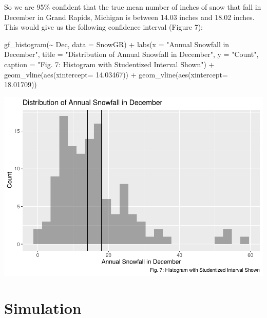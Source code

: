 \documentclass[12pt]{article}
\newenvironment{Shaded}{\begin{snugshade}}{\end{snugshade}}
\newcommand{\AttributeTok}[1]{\textcolor[rgb]{0.77,0.63,0.00}{#1}}
\newcommand{\FloatTok}[1]{\textcolor[rgb]{0.00,0.00,0.81}{#1}}
\newcommand{\FunctionTok}[1]{\textcolor[rgb]{0.00,0.00,0.00}{#1}}
\newcommand{\NormalTok}[1]{#1}
\newcommand{\SpecialCharTok}[1]{\textcolor[rgb]{0.00,0.00,0.00}{#1}}
\newcommand{\StringTok}[1]{\textcolor[rgb]{0.31,0.60,0.02}{#1}}
\begin{document}
So we are 95\% confident that the true mean number of inches of snow
that fall in December in Grand Rapids, Michigan is between 14.03 inches
and 18.02 inches. This would give us the following confidence interval
(Figure 7):

\begin{Shaded}
\begin{Highlighting}[]
\FunctionTok{gf\_histogram}\NormalTok{(}\SpecialCharTok{\textasciitilde{}}\NormalTok{ Dec, }\AttributeTok{data =}\NormalTok{ SnowGR) }\SpecialCharTok{+}
  \FunctionTok{labs}\NormalTok{(}\AttributeTok{x =} \StringTok{"Annual Snowfall in December"}\NormalTok{, }
       \AttributeTok{title =} \StringTok{"Distribution of Annual Snowfall in December"}\NormalTok{, }\AttributeTok{y =} \StringTok{"Count"}\NormalTok{, }
       \AttributeTok{caption =} \StringTok{"Fig. 7: Histogram with Studentized Interval Shown"}\NormalTok{) }\SpecialCharTok{+}
  \FunctionTok{geom\_vline}\NormalTok{(}\FunctionTok{aes}\NormalTok{(}\AttributeTok{xintercept=} \FloatTok{14.03467}\NormalTok{)) }\SpecialCharTok{+}
  \FunctionTok{geom\_vline}\NormalTok{(}\FunctionTok{aes}\NormalTok{(}\AttributeTok{xintercept=} \FloatTok{18.01709}\NormalTok{)) }
\end{Highlighting}
\end{Shaded}

\includegraphics{paper_files/figure-latex/unnamed-chunk-17-1.pdf}

\hypertarget{simulation}{%
\section{Simulation}\label{simulation}}
\end{document}
